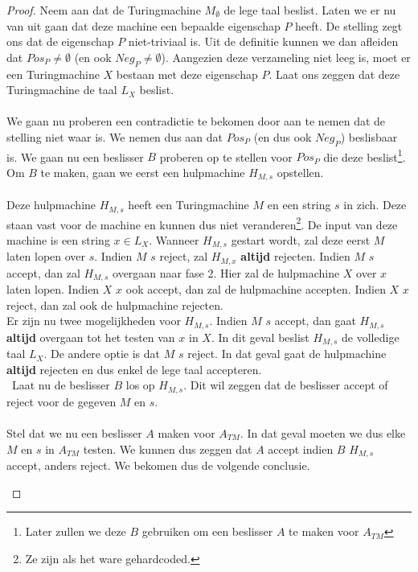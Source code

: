 \documentclass[
10pt,
a4paper,
oneside,
headinclude,footinclude, 
BCOR5mm,
]{scrartcl}
\begin{document}
\begin{proof}
	Neem aan dat de Turingmachine $M_\emptyset$ de lege taal beslist. Laten we er nu van uit gaan dat deze machine een bepaalde eigenschap $P$ heeft. De stelling zegt ons dat de eigenschap $P$ niet-triviaal is. Uit de definitie kunnen we dan afleiden dat $Pos_P \neq \emptyset$ (en ook $Neg_P \neq \emptyset$). Aangezien deze verzameling niet leeg is, moet er een Turingmachine $X$ bestaan met deze eigenschap $P$. Laat ons zeggen dat deze Turingmachine de taal $L_X$ beslist.\\\\
	We gaan nu proberen een contradictie te bekomen door aan te nemen dat de stelling niet waar is. We nemen dus aan dat $Pos_P$ (en dus ook $Neg_P$) beslisbaar is. We gaan nu een beslisser $B$ proberen op te stellen voor $Pos_P$ die deze beslist\footnote{Later zullen we deze $B$ gebruiken om een beslisser $A$ te maken voor $A_{TM}$}. Om $B$ te maken, gaan we eerst een hulpmachine $H_{M,s}$ opstellen.\\\\
	Deze hulpmachine $H_{M,s}$ heeft een Turingmachine $M$ en een string $s$ in zich. Deze staan vast voor de machine en kunnen dus niet veranderen\footnote{Ze zijn als het ware gehardcoded.}. De input van deze machine is een string $x \in L_X$. Wanneer $H_{M,s}$ gestart wordt, zal deze eerst $M$ laten lopen over $s$. Indien $M$ $s$ reject, zal $H_{M,x}$ \textbf{altijd} rejecten. Indien $M$ $s$ accept, dan zal $H_{M,s}$ overgaan naar fase 2. Hier zal de hulpmachine $X$ over $x$ laten lopen. Indien $X$ $x$ ook accept, dan zal de hulpmachine accepten. Indien $X$ $x$ reject, dan zal ook de hulpmachine rejecten.\\
	Er zijn nu twee mogelijkheden voor $H_{M,s}$. Indien $M$ $s$ accept, dan gaat $H_{M,s}$ \textbf{altijd} overgaan tot het testen van $x$ in $X$. In dit geval beslist $H_{M,s}$ de volledige taal $L_X$. De andere optie is dat $M$ $s$ reject. In dat geval gaat de hulpmachine \textbf{altijd} rejecten en dus enkel de lege taal accepteren.\\\
	Laat nu de beslisser $B$ los op $H_{M,s}$. Dit wil zeggen dat de beslisser accept of reject voor de gegeven $M$ en $s$.\\\\
	Stel dat we nu een beslisser $A$ maken voor $A_{TM}$. In dat geval moeten we dus elke $M$ en $s$ in $A_{TM}$ testen. We kunnen dus zeggen dat $A$ accept indien $B$ $H_{M,s}$ accept, anders reject. We bekomen dus de volgende conclusie.
	\begin{center}

\end{center}
\end{proof}
\end{document}
